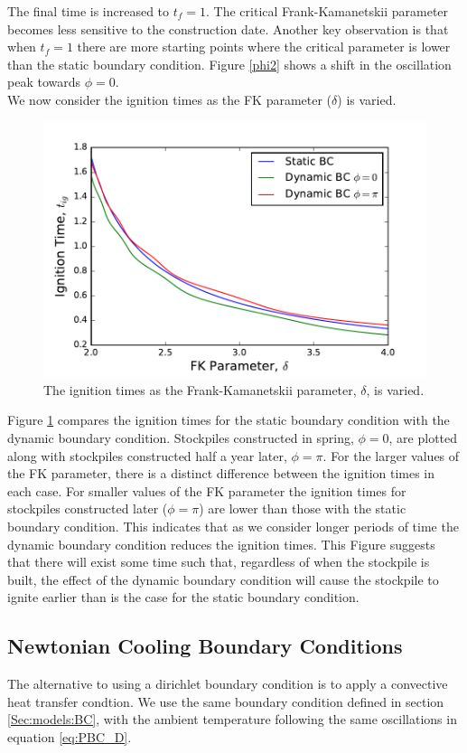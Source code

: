 The final time is increased to $t_f=1$. The critical Frank-Kamanetskii parameter becomes less sensitive to the construction date. Another key observation is that when $t_f=1$ there are more starting points where the critical parameter is lower than the static boundary condition. Figure \ref{phi2} shows a shift in the oscillation peak towards $\phi=0$. \\
We now consider the ignition times as the FK parameter ($\delta$) is varied.
\begin{figure}[h!]
\centering
\includegraphics[scale=0.8]{figures/NDA/PBC/ignitontimes.pdf}
\caption{The ignition times as the Frank-Kamanetskii parameter, $\delta$, is varied.}
\label{ignition}
\end{figure} 
Figure \ref{ignition} compares the ignition times for the static boundary condition with the dynamic boundary condition. Stockpiles constructed in spring, $\phi=0$, are plotted along with stockpiles constructed half a year later, $\phi=\pi$. For the larger values of the FK parameter, there is a distinct difference between the ignition times in each case. For smaller values of the FK parameter the ignition times for stockpiles constructed later ($\phi=\pi$) are lower than those with the static boundary condition. This indicates that as we consider longer periods of time the dynamic boundary condition reduces the ignition times. This Figure suggests that there will exist some time such that, regardless of when the stockpile is built, the effect of the dynamic boundary condition will cause the stockpile to ignite earlier than is the case for the static boundary condition.\\

\subsection{Newtonian Cooling Boundary Conditions}
The alternative to using a dirichlet boundary condition is to apply a convective heat transfer condtion. We use the same boundary condition defined in section \ref{Sec:models:BC}, with the ambient temperature following the same oscillations in equation \ref{eq:PBC_D}.
 
